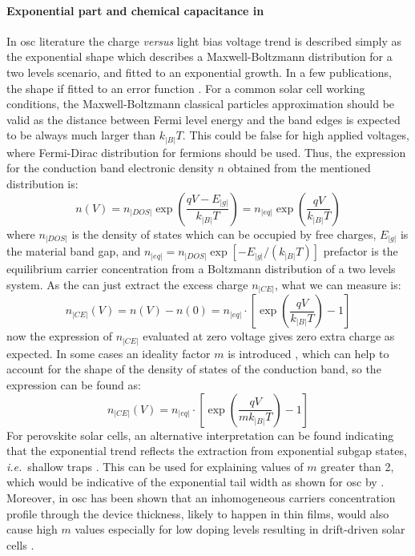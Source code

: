 		\paragraph{Exponential part and chemical capacitance in }\label{ce_exp_osc}
		In \gls{osc} literature the charge \textsl{versus} light bias voltage trend is described simply as the exponential shape which describes a Maxwell\hyp{}Boltzmann distribution for a two levels scenario, and fitted to an exponential growth.
		In a few publications, the shape if fitted to an error function \cite{Ajuria2011}.
		For a common solar cell working conditions, the Maxwell\hyp{}Boltzmann classical particles approximation should be valid as the distance between Fermi level energy and the band edges is expected to be always much larger than $k_|B|T$.
		This could be false for high applied voltages, where Fermi\hyp{}Dirac distribution for fermions should be used.
		Thus, the expression for the conduction band electronic density $n$ obtained from the mentioned distribution is:
		\begin{equation}
			n(V) = n_|DOS| \exp(\frac{qV - E_|g|}{k_|B|T}) = n_|eq| \exp(\frac{qV}{k_|B|T})
		\end{equation}
		where $n_|DOS|$ is the density of states which can be occupied by free charges, $E_|g|$ is the material band gap, and $n_|eq|=n_|DOS|\exp[-E_|g|/(k_|B|T)]$ prefactor is the equilibrium carrier concentration from a Boltzmann distribution of a two levels system. 
		As the  can just extract the excess charge $n_|CE|$, what we can measure is:
		\begin{equation}
			n_|CE|(V) = n(V)-n(0) = n_|eq| \cdot \left[\exp(\frac{qV}{k_|B|T})-1\right]
		\end{equation}
		now the expression of $n_|CE|$ evaluated at zero voltage gives zero extra charge as expected.
		In some cases an ideality factor $m$ is introduced \cite{Kirchartz2012}, which can help to account for the shape of the density of states of the conduction band, so the expression can be found as:
		\begin{equation}\label{eq:ce_osc}
			n_|CE|(V) = n_|eq| \cdot \left[\exp(\frac{qV}{mk_|B|T})-1\right]
		\end{equation}
		For perovskite solar cells, an alternative interpretation can be found indicating that the exponential trend reflects the extraction from exponential subgap states, \textsl{i.e.}\ shallow traps \cite{Du2018}.
		This can be used for explaining values of $m$ greater than 2, which would be indicative of the exponential tail width as shown for \gls{osc} by .
		Moreover, in \gls{osc} has been shown that an inhomogeneous carriers concentration profile through the device thickness, likely to happen in thin films, would also cause high $m$ values \cite{Kirchartz2012} especially for low doping levels resulting in drift\hyp{}driven solar cells \cite{Deledalle2015,Deledalle2014}.


